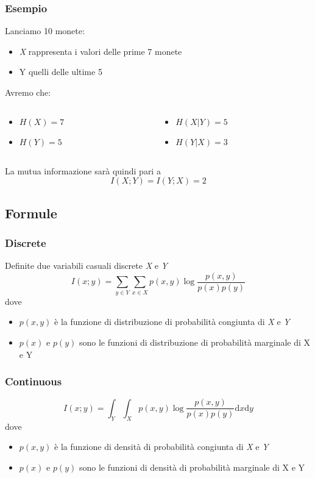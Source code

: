 \documentclass{beamer}
\begin{document}
\begin{frame}
	\frametitle{Esempio}
	Lanciamo 10 monete:
	\begin{itemize}
		\item \emph{X} rappresenta i valori delle prime 7 monete
		\item Y quelli delle ultime 5
	\end{itemize}
	Avremo che:
	\begin{columns}
		\begin{column}{0.5\textwidth}
			\begin{itemize}
				\item $H(X) = 7$
				\item $H(Y) = 5$\newline
			\end{itemize}
		\end{column}
		\begin{column}{0.5\textwidth}
			\begin{itemize}
				\item $H(X|Y) = 5$
				\item $H(Y|X) = 3$\newline
			\end{itemize}
		\end{column}
	\end{columns}
	La mutua informazione sarà quindi pari a
$$I(X; Y ) = I(Y ; X) = 2 $$
\end{frame}
\subsection{Formule}
\begin{frame}
	\frametitle{Discrete}
	Definite due variabili casuali discrete \emph{X} e \emph{Y}
	$$ I (x;y) = \sum\limits_{y \in Y} \sum\limits_{x \in X} p(x,y)\log \frac{p(x,y)}{p(x)p(y)}$$
	dove
	\begin{itemize}
		\item $p(x,y)$ è la funzione di distribuzione di probabilità congiunta di \emph{X} e \emph{Y}
		\item $p(x)$ e $p(y)$ sono le funzioni di distribuzione di probabilità marginale di X e Y
	\end{itemize}
\end{frame}
\begin{frame}
	\frametitle{Continuous}
	$$ I (x;y) = \int_Y \int_X p(x,y)\log \frac{p(x,y)}{p(x)p(y)} \mathrm{d}x \mathrm{d}y$$
	dove
	\begin{itemize}
		\item $p(x,y)$ è la funzione di densità di probabilità congiunta di \emph{X} e \emph{Y}
		\item $p(x)$ e $p(y)$ sono le funzioni di densità di probabilità marginale di X e Y
	\end{itemize}
\end{frame}
\end{document}
